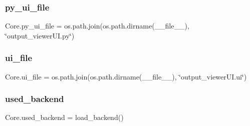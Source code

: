 \hypertarget{a00050_a4cd2f45c63964d86002d7a37c7141973}{}\label{a00050_a4cd2f45c63964d86002d7a37c7141973} 
\subsubsection{\texorpdfstring{py\+\_\+ui\+\_\+file}{py\_ui\_file}}
{\footnotesize\ttfamily Core.\+py\+\_\+ui\+\_\+file = os.\+path.\+join(os.\+path.\+dirname(\+\_\+\+\_\+file\+\_\+\+\_\+), \char`\"{}output\+\_\+viewer\+U\+I.\+py\char`\"{})}

\hypertarget{a00050_a1363a763ded79810023c205b7ed824f0}{}\label{a00050_a1363a763ded79810023c205b7ed824f0} 
\subsubsection{\texorpdfstring{ui\+\_\+file}{ui\_file}}
{\footnotesize\ttfamily Core.\+ui\+\_\+file = os.\+path.\+join(os.\+path.\+dirname(\+\_\+\+\_\+file\+\_\+\+\_\+), \char`\"{}output\+\_\+viewer\+U\+I.\+ui\char`\"{})}

\hypertarget{a00050_a5233d27f0fe842cb39f926c4360e63dd}{}\label{a00050_a5233d27f0fe842cb39f926c4360e63dd} 
\subsubsection{\texorpdfstring{used\+\_\+backend}{used\_backend}}
{\footnotesize\ttfamily Core.\+used\+\_\+backend = load\+\_\+backend()}

